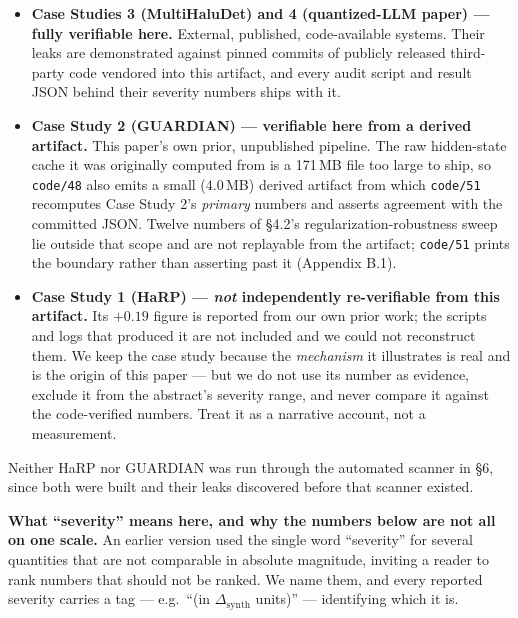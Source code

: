 \documentclass[10pt]{article} %
\begin{document}
\begin{itemize}
\item \textbf{Case Studies 3 (MultiHaluDet) and 4 (quantized-LLM paper)
  --- fully verifiable here.} External, published, code-available
  systems. Their leaks are demonstrated against pinned commits of
  publicly released third-party code vendored into this artifact, and
  every audit script and result JSON behind their severity numbers ships
  with it.
\item \textbf{Case Study 2 (GUARDIAN) --- verifiable here from a derived
  artifact.} This paper's own prior, unpublished pipeline. The raw
  hidden-state cache it was originally computed from is a 171\,MB file too
  large to ship, so \texttt{code/48} also emits a small ($4.0$\,MB) derived
  artifact from which \texttt{code/51} recomputes Case Study 2's
  \emph{primary} numbers and asserts agreement with the committed JSON. Twelve
  numbers of §4.2's regularization-robustness sweep lie outside that scope and
  are not replayable from the artifact; \texttt{code/51} prints the boundary
  rather than asserting past it (Appendix B.1).
\item \textbf{Case Study 1 (HaRP) --- \emph{not} independently re-verifiable
  from this artifact.} Its $+0.19$ figure is reported from our own prior work;
  the scripts and logs that produced it are not included and we could not
  reconstruct them. We keep the case study because the \emph{mechanism} it
  illustrates is real and is the origin of this paper --- but we do not use its
  number as evidence, exclude it from the abstract's severity range, and never
  compare it against the code-verified numbers. Treat it as a narrative
  account, not a measurement.
\end{itemize}

Neither HaRP nor GUARDIAN was run through the automated scanner in §6,
since both were built and their leaks discovered before that scanner
existed.

\textbf{What ``severity'' means here, and why the numbers below are not all on
one scale.} An earlier version used the single word ``severity'' for several
quantities that are not comparable in absolute magnitude, inviting a reader to
rank numbers that should not be ranked. We name them, and every reported
severity carries a tag --- e.g.\ ``(in $\Delta_{\text{synth}}$ units)'' ---
identifying which it is.
\end{document}
